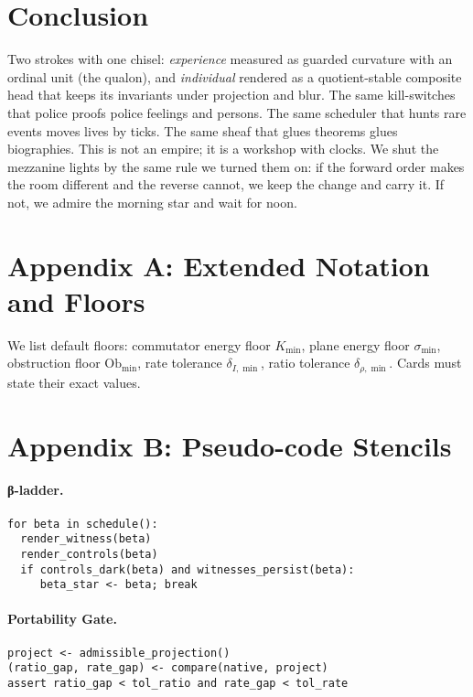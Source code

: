 \documentclass[11pt]{article}
\newcommand{\1}{\mathbf{1}}
\newcommand{\ratio}{\rho}
\newcommand{\rate}{I}
\newcommand{\Ob}{\mathrm{Ob}}
\begin{document}
\section{Conclusion}
Two strokes with one chisel: \emph{experience} measured as guarded curvature with an ordinal unit (the qualon), and \emph{individual} rendered as a quotient-stable composite head that keeps its invariants under projection and blur. The same kill-switches that police proofs police feelings and persons. The same scheduler that hunts rare events moves lives by ticks. The same sheaf that glues theorems glues biographies. This is not an empire; it is a workshop with clocks. We shut the mezzanine lights by the same rule we turned them on: if the forward order makes the room different and the reverse cannot, we keep the change and carry it. If not, we admire the morning star and wait for noon.

\appendix
\section*{Appendix A: Extended Notation and Floors}
We list default floors: commutator energy floor $K_{\min}$, plane energy floor $\sigma_{\min}$, obstruction floor $\Ob_{\min}$, rate tolerance $\delta_{\rate,\min}$, ratio tolerance $\delta_{\ratio,\min}$. Cards must state their exact values.

\section*{Appendix B: Pseudo-code Stencils}

\paragraph{β-ladder.}
{\small
\begin{verbatim}
for beta in schedule():
  render_witness(beta)
  render_controls(beta)
  if controls_dark(beta) and witnesses_persist(beta):
     beta_star <- beta; break
\end{verbatim}}

\paragraph{Portability Gate.}
{\small
\begin{verbatim}
project <- admissible_projection()
(ratio_gap, rate_gap) <- compare(native, project)
assert ratio_gap < tol_ratio and rate_gap < tol_rate
\end{verbatim}}
\end{document}
